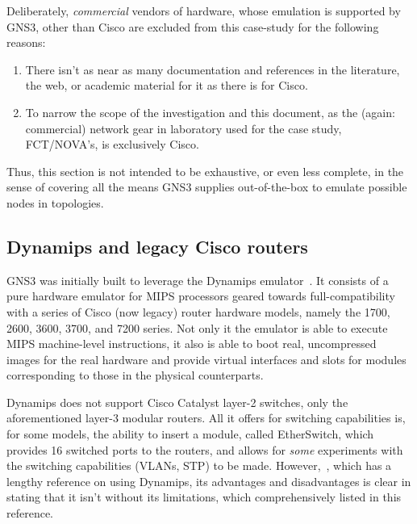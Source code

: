 

Deliberately, \emph{commercial} vendors of hardware, whose emulation is supported by GNS3, other than Cisco are excluded from this case-study for the following reasons:

\begin{enumerate}
  \item There isn't as near as many documentation and references in the literature, the web, or academic material for it as there is for Cisco.
  \item To narrow the scope of the investigation and this document, as the (again: commercial) network gear in laboratory used for the case study, FCT/NOVA's, is exclusively Cisco.
\end{enumerate}

Thus, this section is not intended to be exhaustive, or even less complete, in the sense of covering all the means GNS3 supplies out-of-the-box to emulate possible nodes in topologies.

\subsection{Dynamips and legacy Cisco routers}
\label{subsec:gns3dynamipslegacy}

GNS3 was initially built to leverage the Dynamips emulator~\cite{thebookofgns3}.
It consists of a pure hardware emulator for MIPS processors geared towards full-compatibility with a series of Cisco (now legacy) router hardware models, namely the 1700, 2600, 3600, 3700, and 7200 series. %
Not only it the emulator is able to execute MIPS machine-level instructions, it also is able to boot real, uncompressed images for the real hardware and provide virtual interfaces and slots for modules corresponding to those in the physical counterparts.

Dynamips does not support Cisco Catalyst layer-2 switches, only the aforementioned layer-3 modular routers.
All it offers for switching capabilities is, for some models, the ability to insert a module, called EtherSwitch, which provides 16 switched ports to the routers, and allows for \emph{some} experiments with the switching capabilities (VLANs, STP) to be made.
However,~\cite{thebookofgns3}, which has a lengthy reference on using Dynamips, its advantages and disadvantages is clear in stating that it isn't without its limitations, which comprehensively listed in this reference.


